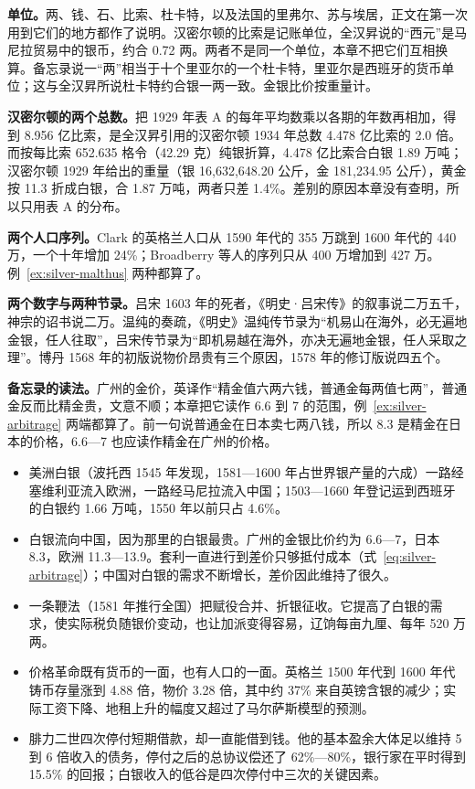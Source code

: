 \begin{deeper}[单位、数据与几处不一致]
\textbf{单位。}两、钱、石、比索、杜卡特，以及法国的里弗尔、苏与埃居，正文在第一次用到它们的地方都作了说明。汉密尔顿的比索是记账单位，全汉昇说的“西元”是马尼拉贸易中的银币，约合 0.72 两\cite{quan1969}。两者不是同一个单位，本章不把它们互相换算。备忘录说一“两”相当于十个里亚尔的一个杜卡特\cite{br}，里亚尔是西班牙的货币单位；这与全汉昇所说杜卡特约合银一两一致。金银比价按重量计。

\textbf{汉密尔顿的两个总数。}把 1929 年表 A 的每年平均数乘以各期的年数再相加，得到 8.956 亿比索，是全汉昇引用的汉密尔顿 1934 年总数 4.478 亿比索的 2.0 倍\cite{quan1969}。而按每比索 652.635 格令（42.29 克）纯银折算，4.478 亿比索合白银 1.89 万吨；汉密尔顿 1929 年给出的重量（银 16,632,648.20 公斤，金 181,234.95 公斤），黄金按 11.3 折成白银，合 1.87 万吨，两者只差 1.4\%。差别的原因本章没有查明，所以只用表 A 的分布。

\textbf{两个人口序列。}Clark 的英格兰人口从 1590 年代的 355 万跳到 1600 年代的 440 万，一个十年增加 24\%；Broadberry 等人的序列只从 400 万增加到 427 万。例~\ref{ex:silver-malthus} 两种都算了。

\textbf{两个数字与两种节录。}吕宋 1603 年的死者，《明史·吕宋传》的叙事说二万五千，神宗的诏书说二万。温纯的奏疏，《明史》温纯传节录为“机易山在海外，必无遍地金银，任人往取”，吕宋传节录为“即机易越在海外，亦决无遍地金银，任人采取之理”\cite{mingshi}。博丹 1568 年的初版说物价昂贵有三个原因，1578 年的修订版说四五个\cite{lebranchu1934,bodin1578}。

\textbf{备忘录的读法。}广州的金价，英译作“精金值六两六钱，普通金每两值七两”，普通金反而比精金贵，文意不顺；本章把它读作 6.6 到 7 的范围，例~\ref{ex:silver-arbitrage} 两端都算了。前一句说普通金在日本卖七两八钱\cite{br}，所以 8.3 是精金在日本的价格，6.6—7 也应读作精金在广州的价格。
\end{deeper}

\begin{takeaways}
\begin{itemize}
\item 美洲白银（波托西 1545 年发现，1581—1600 年占世界银产量的六成）一路经塞维利亚流入欧洲，一路经马尼拉流入中国；1503—1660 年登记运到西班牙的白银约 1.66 万吨，1550 年以前只占 4.6\%。
\item 白银流向中国，因为那里的白银最贵。广州的金银比价约为 6.6—7，日本 8.3，欧洲 11.3—13.9。套利一直进行到差价只够抵付成本（式~\eqref{eq:silver-arbitrage}）；中国对白银的需求不断增长，差价因此维持了很久。
\item 一条鞭法（1581 年推行全国）把赋役合并、折银征收。它提高了白银的需求，使实际税负随银价变动，也让加派变得容易，辽饷每亩九厘、每年 520 万两。
\item 价格革命既有货币的一面，也有人口的一面。英格兰 1500 年代到 1600 年代铸币存量涨到 4.88 倍，物价 3.28 倍，其中约 37\% 来自英镑含银的减少；实际工资下降、地租上升的幅度又超过了马尔萨斯模型的预测。
\item 腓力二世四次停付短期借款，却一直能借到钱。他的基本盈余大体足以维持 5 到 6 倍收入的债务，停付之后的总协议偿还了 62\%—80\%，银行家在平时得到 15.5\% 的回报；白银收入的低谷是四次停付中三次的关键因素。
\end{itemize}
\end{takeaways}

